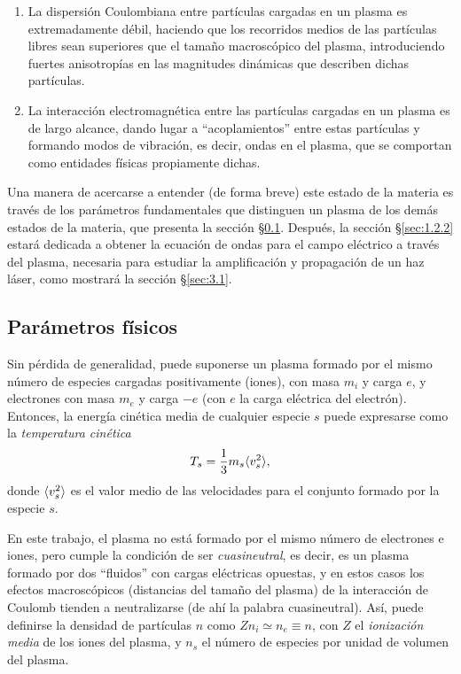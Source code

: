 \begin{enumerate}[label=(\roman*)]

    \item La dispersión Coulombiana entre partículas cargadas en un plasma es extremadamente débil, haciendo que los recorridos medios de las partículas libres sean superiores que el tamaño macroscópico del plasma, introduciendo fuertes anisotropías en las magnitudes dinámicas que describen dichas partículas.

    \item La interacción electromagnética entre las partículas cargadas en un plasma es de largo alcance, dando lugar a \enquote{acoplamientos} entre estas partículas y formando modos de vibración, es decir, ondas en el plasma, que se comportan como entidades físicas propiamente dichas.

\end{enumerate}

Una manera de acercarse a entender (de forma breve) este estado de la materia es través de los parámetros fundamentales que distinguen un plasma de los demás estados de la materia, que presenta la sección \S\ref{sec:1.2.1}. Después, la sección \S\ref{sec:1.2.2} estará dedicada a obtener la ecuación de ondas para el campo eléctrico a través del plasma, necesaria para estudiar la amplificación y propagación de un haz láser, como mostrará la sección \S\ref{sec:3.1}.

\subsection{Parámetros físicos}\label{sec:1.2.1}
Sin pérdida de generalidad, puede suponerse un plasma formado por el mismo número de especies cargadas positivamente (iones), con masa $m_{i}$ y carga $e$, y electrones con masa $m_{e}$ y carga $-e$ (con $e$ la carga eléctrica del electrón). Entonces, la energía cinética media de cualquier especie $s$ puede expresarse como la \emph{temperatura cinética} \autocite{Fitzpatrick2022}
\begin{equation}\label{eq:1.45}
  T_{s} = \frac{1}{3}m_{s}\langle v_{s}^{2}\rangle,
\end{equation}
donde $\langle v_{s}^{2}\rangle$ es el valor medio de las velocidades para el conjunto formado por la especie $s$.

En este trabajo, el plasma no está formado por el mismo número de electrones e iones, pero cumple la condición de ser \emph{cuasineutral}, es decir, es un plasma formado por dos \enquote{fluidos} con cargas eléctricas opuestas, y en estos casos los efectos macroscópicos (distancias del tamaño del plasma) de la interacción de Coulomb tienden a neutralizarse (de ahí la palabra cuasineutral). Así, puede definirse la densidad de partículas $n$ como $Zn_{i} \simeq n_{e} \equiv n$, con $Z$ el \emph{ionización media} de los iones del plasma, y $n_{s}$ el número de especies por unidad de volumen del plasma. 

